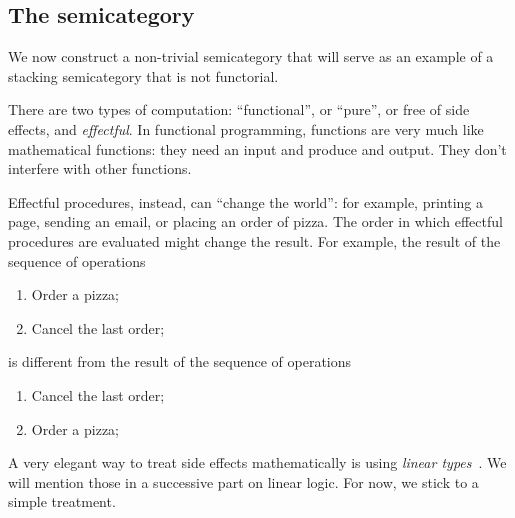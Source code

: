 %

\subsection{The semicategory \Effects}

We now construct a non-trivial semicategory that will serve as an example of a stacking semicategory that is not functorial.

There are two types of computation: ``functional'', or ``pure'', or free of side effects, and \emph{effectful}.
In functional programming, functions are very much like mathematical functions: they need an input and produce and output.
They don't interfere with other functions.

Effectful procedures,  instead, can ``change the world'': for example, printing a page, sending an email, or placing an order of pizza.
The order in which effectful procedures are evaluated might change the result.
For example, the result of the sequence of operations
%
\begin{enumerate}
    \item Order a pizza;
    \item Cancel the last order;
\end{enumerate}
%
is different from the result of the sequence of operations
%
\begin{enumerate}
    \item Cancel the last order;
    \item Order a pizza;
\end{enumerate}

A very elegant way to treat side effects mathematically is using \emph{linear types}~\cite{Wadler90lineartypes}.
We will mention those in a successive part on linear logic.
For now, we stick to a simple treatment.

\begin{marginfigure}
    \centering
    \\
    \caption{}
    \label{fig:effects12}
\end{marginfigure}

